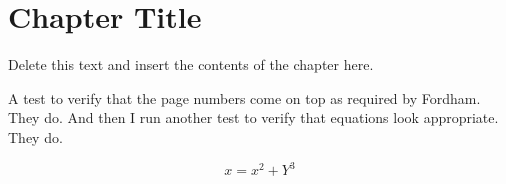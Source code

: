 
\chapter{Chapter Title}

Delete this text and insert the contents of the chapter here.

\newpage
A test to verify that the page numbers come on top as required by Fordham. They do. And then I run another test to verify that equations look appropriate. They do. 


\begin{equation}
    x = x^2 + Y^3
\end{equation}

